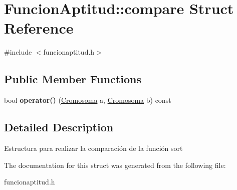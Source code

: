 \hypertarget{structFuncionAptitud_1_1compare}{\section{Funcion\-Aptitud\-:\-:compare Struct Reference}
\label{structFuncionAptitud_1_1compare}
}


{\ttfamily \#include $<$funcionaptitud.\-h$>$}

\subsection*{Public Member Functions}
\begin{DoxyCompactItemize}
\item 
\hypertarget{structFuncionAptitud_1_1compare_ac7400ce0c2f1c80b038e35282ec2e379}{bool {\bfseries operator()} (\hyperlink{classCromosoma}{Cromosoma} a, \hyperlink{classCromosoma}{Cromosoma} b) const }\label{structFuncionAptitud_1_1compare_ac7400ce0c2f1c80b038e35282ec2e379}

\end{DoxyCompactItemize}


\subsection{Detailed Description}
Estructura para realizar la comparación de la función sort 

The documentation for this struct was generated from the following file\-:\begin{DoxyCompactItemize}
\item 
funcionaptitud.\-h\end{DoxyCompactItemize}
